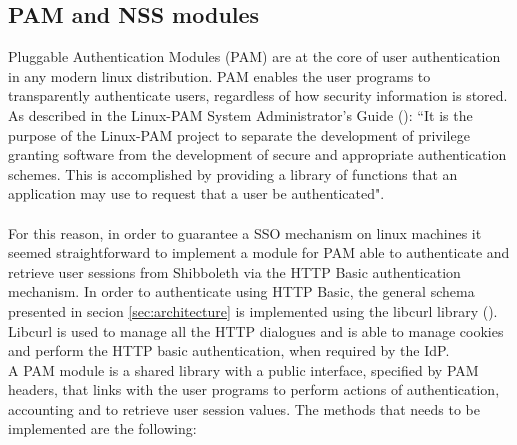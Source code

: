 \label{sec:pamnss}
\subsection{PAM and NSS modules}
Pluggable Authentication Modules (PAM) are at the core of user authentication in any modern linux distribution.
PAM enables the user programs to transparently authenticate users, regardless of how security information is stored.
As described in the Linux-PAM System Administrator's Guide (\cite{Morgan-1996}): ``It is the purpose of the Linux-PAM project to separate
the development of privilege granting software from the development of secure and appropriate authentication schemes.
This is accomplished by providing a library of functions that an application may use to request that a user be authenticated".\\
\\
For this reason, in order to guarantee a SSO mechanism on linux machines it seemed straightforward to implement a module for
PAM able to authenticate and retrieve user sessions from Shibboleth via the HTTP Basic authentication mechanism.
In order to authenticate using HTTP Basic, the general schema presented in secion \ref{sec:architecture} is implemented using the
libcurl library (\cite{Stenberg-1996}).\\
Libcurl is used to manage all the HTTP dialogues and is able to manage cookies and perform the HTTP basic authentication, when
required by the IdP.
\\
A PAM module is a shared library with a public interface, specified by PAM headers, that links with the user programs to perform
actions of authentication, accounting and to retrieve user session values.
The methods that needs to be implemented are the following:
